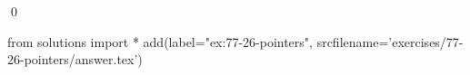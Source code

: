 
\begin{ex}
  \label{ex:77-26-pointers}
  
  \qed
\end{ex}
\begin{python0}
from solutions import *
add(label="ex:77-26-pointers",
    srcfilename='exercises/77-26-pointers/answer.tex')
\end{python0}
